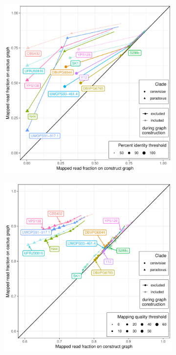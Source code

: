 \documentclass{article}
\begin{document}
\clearpage
\begin{figure}
  \begin{subfigure}[b]{.5\textwidth}
    \caption{}
    \includegraphics[width=\textwidth]{pdf/yeast-mapping-identity-four.pdf}
  \end{subfigure}
  \begin{subfigure}[b]{.5\textwidth}
    \caption{}
    \includegraphics[width=\textwidth]{pdf/yeast-mapping-quality-four.pdf}
  \end{subfigure}
\end{figure}
\end{document}
